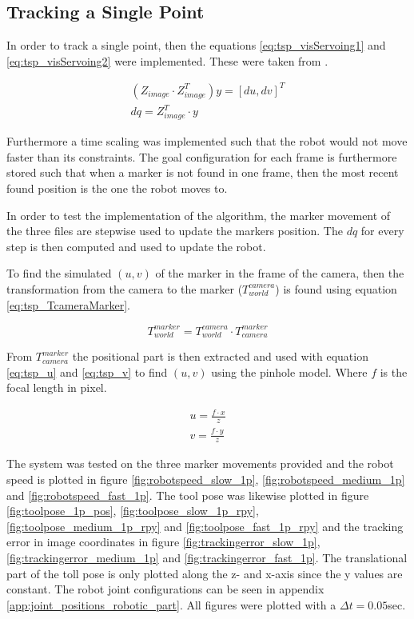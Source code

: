 \subsection{Tracking a Single Point}
In order to track a single point, then the equations \ref{eq:tsp_visServoing1} and \ref{eq:tsp_visServoing2}  were implemented.
These were taken from \cite{book:roboticNotes}.

\begin{eqnarray}
(Z_{image} \cdot Z_{image}^T) y = [du, dv]^T \label{eq:tsp_visServoing1} \\
dq = Z_{image}^T \cdot y \label{eq:tsp_visServoing2}
\end{eqnarray}

Furthermore a time scaling was implemented such that the robot would not move faster than its constraints.
The goal configuration for each frame is furthermore stored such that when a marker is not found in one frame, then the most recent found position is the one the robot moves to.

In order to test the implementation of the algorithm, the marker movement of the three files are stepwise used to update the markers position.
The $dq$ for every step is then computed and used to update the robot.

To find the simulated $(u,v)$ of the marker in the frame of the camera, then the transformation from the camera to the marker ($T_{world}^{camera}$) is found using equation \ref{eq:tsp_TcameraMarker}.

\begin{equation}
T_{world}^{marker} = T_{world}^{camera} \cdot T_{camera}^{marker} \label{eq:tsp_TcameraMarker}
\end{equation}

From $T_{camera}^{marker}$ the positional part is then extracted and used with equation \ref{eq:tsp_u} and \ref{eq:tsp_v} to find $(u,v)$ using the pinhole model.
Where $f$ is the focal length in pixel.

\begin{eqnarray}
u = \frac{f \cdot x}{z} \label{eq:tsp_u} \\
v = \frac{f \cdot y}{z} \label{eq:tsp_v}
\end{eqnarray}


The system was tested on the three marker movements provided and the robot speed is plotted in figure \ref{fig:robotspeed_slow_1p}, \ref{fig:robotspeed_medium_1p} and \ref{fig:robotspeed_fast_1p}.
The tool pose was likewise plotted in figure \ref{fig:toolpose_1p_pos}, \ref{fig:toolpose_slow_1p_rpy}, \ref{fig:toolpose_medium_1p_rpy} and \ref{fig:toolpose_fast_1p_rpy} and the tracking error in image coordinates in figure \ref{fig:trackingerror_slow_1p}, \ref{fig:trackingerror_medium_1p} and \ref{fig:trackingerror_fast_1p}.
The translational part of the toll pose is only plotted along the z- and x-axis since the y values are constant.
The robot joint configurations can be seen in appendix \ref{app:joint_positions_robotic_part}.
All figures were plotted with a $\Delta t = 0.05$sec.

